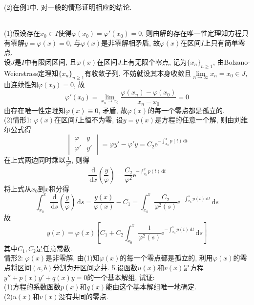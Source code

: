 \documentclass[titlepage,11pt,a4paper,twoside]{report}
\makeatletter
\newcommand\diff{\,\mathrm{d}}
\newcommand\e{\mathrm{e}}
\newenvironment{solve}{\par
	\pushQED{\qed}%
	\normalfont \topsep1\p@\@plus6\p@\relax
	\trivlist
	\item\relax
	{\hspace*{\parindent}{\heiti 解}\@addpunct{:}}\hspace\labelsep\ignorespaces
}{%
	\popQED\endtrivlist\@endpefalse
}
\makeatother
\begin{document}
(2)在例1中, 对一般的情形证明相应的结论.
\begin{solve}\\(1)假设存在$x_0\in I$使得$\varphi(x_0)=\varphi'(x_0)=0$, 则由解的存在唯一性定理知方程只有零解$y=\varphi(x)=0$, 与$\varphi(x)$是非零解相矛盾, 故$\varphi(x)$在区间$I$上只有简单零点.\\
设$J$是$I$中有限闭区间, 且$\varphi(x)$在区间$J$上有无限个零点, 记为$\{x_n\}_{n\geq 1}$, 由Bolzano-Weierstrass定理知$\{x_n\}_{n\geq 1}$有收敛子列, 不妨就设其本身收敛且$\lim\limits_{n\to\infty}x_n=x_0\in J$, 由连续性知$\varphi(x_0)=0$, 故
\[\varphi'(x_0)=\lim_{x_n\to x_0}\frac{\varphi(x_n)-\varphi(x_0)}{x_n-x_0}=0\]
由存在唯一性定理知$\varphi(x)\equiv0$, 矛盾, 故$\varphi(x)$的每一个零点都是孤立的.\\
(2)情形1: $\varphi(x)$在区间$I$上恒不为零, 设$y=y(x)$是方程的任意一个解, 则由刘维尔公式得
\[\begin{vmatrix}\varphi&y\\\varphi'&y'\end{vmatrix}=\varphi y'-\varphi'y=C_2\e^{-\int_{x_0}^xp(t)\diff t}\]
在上式两边同时乘以$\frac{1}{\varphi^2}$, 则得
\[\frac{\diff}{\diff x}\left(\frac{y}{\varphi}\right)=\frac{C_2}{\varphi^2}\e^{-\int_{x_0}^xp(t)\diff t}\]
将上式从$x_0$到$x$积分得
\[\int_{x_0}^x\frac{\diff}{\diff s}\left(\frac{y}{\varphi}\right)\diff s=\frac{y(x)}{\varphi(x)}-C_1=\int_{x_0}^x\frac{C_2}{\varphi^2(s)}\e^{-\int_{x_0}^sp(t)\diff t}\diff s\]
故\[y(x)=\varphi(x)\left[C_1+C_2\int_{x_0}^x\frac{1}{\varphi^2(s)}\e^{-\int_{x_0}^sp(t)\diff t}\diff s\right]\]
其中$C_1,C_2$是任意常数.\\
情形2: $\varphi(x)$是非零解, 由(1)知$\varphi(x)$的每一个零点都是孤立的, 利用$\varphi(x)$的零点将区间$(a,b)$分割为开区间之并.
\end{solve}
5.设函数$u(x)$和$v(x)$是方程$y''+p(x)y'+q(x)y=0$的一个基本解组, 试证:\\
(1)方程的系数函数$p(x)$和$q(x)$能由这个基本解组唯一地确定.\\
(2)$u(x)$和$v(x)$没有共同的零点.
\end{document}
